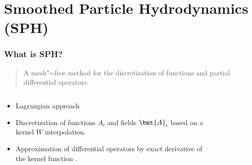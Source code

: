 \section{Smoothed Particle Hydrodynamics (SPH)}

\begin{frame}
    \frametitle{What is SPH?}

    \begin{quote}
        \glqq{}A mesh"=free method for the discretization of functions and partial
        differential operators.\grqq{} \cite{SPH_Tutorial_2019}
    \end{quote}

    \begin{columns}[T] %
        \begin{column}{.4\textwidth}

            \vspace*{0.2cm}
            \begin{itemize}
                \item Lagrangian approach
            \end{itemize}

            \vspace*{1.6cm}

            \begin{itemize}
                \item Discretization of functions $A_i$ and fields $\bmt{A}_i$ based on a
                      kernel $W$ interpolation.
            \end{itemize}
            \vspace*{1.2cm}

            \begin{itemize}
                \item Approximation of differential operators by exact derivative of the
                      kernel function \cite{Price2012}.
            \end{itemize}
        \end{column}
        \hfill
        \begin{column}{.6\textwidth}
            \begin{figure}[h]
                \centering
                \def\svgwidth{0.25\textwidth}
                
                \label{fig: lagragian}
            \end{figure}
            \vspace*{0.3cm}


\end{column}
\end{columns}
\end{frame}
